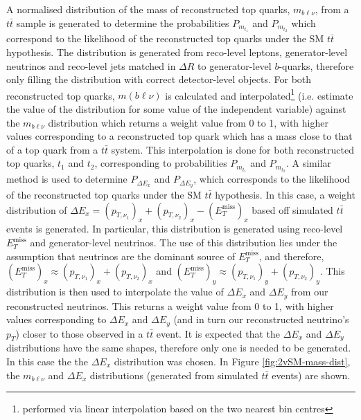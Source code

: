 A normalised distribution of the mass of reconstructed top quarks, $m_{b\ell\nu}$, from a $t\bar{t}$ sample is generated to determine the probabilities $P_{m_{t_{1}}}$ and $P_{m_{t_{2}}}$ which correspond to the likelihood of the reconstructed top quarks under the SM $t\bar{t}$ hypothesis. The distribution is generated from reco-level leptons, generator-level neutrinos and reco-level jets matched in $\Delta R$ to generator-level $b$-quarks, therefore only filling the distribution with correct detector-level objects. For both reconstructed top quarks, $m(b\ell\nu)$ is calculated and interpolated\footnote{performed via linear interpolation based on the two nearest bin centres} (i.e. estimate the value of the distribution for some value of the independent variable) against the $m_{b\ell\nu}$ distribution which returns a weight value from 0 to 1, with higher values corresponding to a reconstructed top quark which has a mass close to that of a top quark from a $t\bar{t}$ system. This interpolation is done for both reconstructed top quarks, $t_{1}$ and $t_{2}$, corresponding to probabilities $P_{m_{t_{1}}}$ and $P_{m_{t_{2}}}$. A similar method is used to determine $P_{\Delta E_{x}}$ and $P_{\Delta E_{y}}$, which corresponds to the likelihood of the reconstructed top quarks under the SM $t\bar{t}$ hypothesis. In this case, a weight distribution of $\Delta E_{x} = (p_{T,\nu_{1}})_{x} + (p_{T,\nu_{2}})_{x} - (E_{T}^{\text{miss}})_{x}$ based off simulated $t\bar{t}$ events is generated. In particular, this distribution is generated using reco-level $E_{T}^{\text{miss}}$ and generator-level neutrinos. The use of this distribution lies under the assumption that neutrinos are the dominant source of $E_{T}^{\text{miss}}$, and therefore, $(E_{T}^{\text{miss}})_{x} \approx (p_{T,\nu_{1}})_{x} + (p_{T,\nu_{2}})_{x}$ and $(E_{T}^{\text{miss}})_{y} \approx (p_{T,\nu_{1}})_{y} + (p_{T,\nu_{2}})_{y}$. This distribution is then used to interpolate the value of $\Delta E_{x}$ and $\Delta E_{y}$ from our reconstructed neutrinos. This returns a weight value from 0 to 1, with higher values corresponding to $\Delta E_{x}$ and $\Delta E_{y}$ (and in turn our reconstructed neutrino's $p_{T}$) closer to those observed in a $t\bar{t}$ event. It is expected that the $\Delta E_{x}$ and $\Delta E_{y}$ distributions have the same shapes, therefore only one is needed to be generated. In this case the the $\Delta E_{x}$ distribution was chosen. In Figure \ref{fig:2vSM-mass-dist}, the $m_{b\ell\nu}$ and $\Delta E_{x}$ distributions (generated from simulated $t\bar{t}$ events)  are shown.

